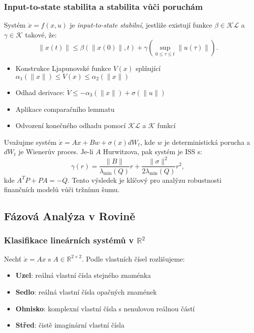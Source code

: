 \subsubsection{Input-to-state stabilita a stabilita vůči poruchám}

\begin{definition}
Systém $\dot{x} = f(x,u)$ je \emph{input-to-state stabilní}, jestliže existují funkce $\beta \in \mathcal{KL}$ a $\gamma \in \mathcal{K}$ takové, že:
\[
\|x(t)\| \leq \beta(\|x(0)\|, t) + \gamma\left(\sup_{0\leq \tau \leq t} \|u(\tau)\|\right).
\]
\end{definition}

\begin{proofsketch}
\begin{itemize}
\item Konstrukce Ljapunovské funkce $V(x)$ splňující $\alpha_1(\|x\|) \leq V(x) \leq \alpha_2(\|x\|)$
\item Odhad derivace: $\dot{V} \leq -\alpha_3(\|x\|) + \sigma(\|u\|)$
\item Aplikace comparačního lemmatu
\item Odvození konečného odhadu pomocí $\mathcal{KL}$ a $\mathcal{K}$ funkcí
\end{itemize}
\end{proofsketch}

\begin{application}
Uvažujme systém $\dot{x} = Ax + Bw + \sigma(x)dW_t$, kde $w$ je deterministická porucha a $dW_t$ je Wienerův proces. Je-li $A$ Hurwitzova, pak systém je ISS s:
\[
\gamma(r) = \frac{\|B\|}{\lambda_{\min}(Q)}r + \frac{\|\sigma\|^2}{2\lambda_{\min}(Q)}r^2,
\]
kde $A^T P + PA = -Q$. Tento výsledek je klíčový pro analýzu robustnosti finančních modelů vůči tržnímu šumu.
\end{application}

\spc

\subsection{Fázová Analýza v Rovině}

\subsubsection{Klasifikace lineárních systémů v $\mathbb{R}^2$}

\begin{theorem}
Nechť $\dot{x} = Ax$ s $A \in \mathbb{R}^{2\times 2}$. Podle vlastních čísel rozlišujeme:
\begin{itemize}
\item \textbf{Uzel}: reálná vlastní čísla stejného znaménka
\item \textbf{Sedlo}: reálná vlastní čísla opačných znamének  
\item \textbf{Ohnisko}: komplexní vlastní čísla s nenulovou reálnou částí
\item \textbf{Střed}: čistě imaginární vlastní čísla
\end{itemize}
\end{theorem}

